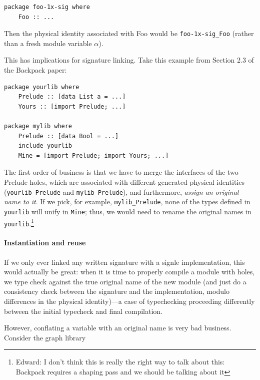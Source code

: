 \documentclass{article}
\begin{document}
\begin{verbatim}
package foo-1x-sig where
    Foo :: ...
\end{verbatim}

Then the physical identity associated with Foo would be
\verb|foo-1x-sig_Foo| (rather than a fresh module variable $\alpha$).

This has implications for signature linking. Take this example from
Section 2.3 of the Backpack paper:

\begin{verbatim}
package yourlib where
    Prelude :: [data List a = ...]
    Yours :: [import Prelude; ...]

package mylib where
    Prelude :: [data Bool = ...]
    include yourlib
    Mine = [import Prelude; import Yours; ...]
\end{verbatim}

The first order of business is that we have to merge the interfaces of
the two Prelude holes, which are associated with different generated
physical identities (\verb|yourlib_Prelude| and \verb|mylib_Prelude|),
and furthermore, \emph{assign an original name to it}.  If we pick,
for example, \verb|mylib_Prelude|, none of the types defined in \verb|yourlib|
will unify in \verb|Mine|; thus, we would need to rename the original names
in \verb|yourlib|.\footnote{Edward: I don't think this is really the
right way to talk about this: Backpack requires a shaping pass and we should
be talking about it}

\iffalse%


\paragraph{Instantiation and reuse}

If we only ever linked any written signature with a signle implementation, this would actually
be great: when it is time to properly compile a module with holes, we
type check against the true original name of the new module (and just
do a consistency check between the signature and the implementation, modulo
differences in the physical identity)---a case of typechecking proceeding
differently between the initial typecheck and final compilation.

However, conflating a variable with an original name is very bad business.
Consider the graph library 
\end{document}
